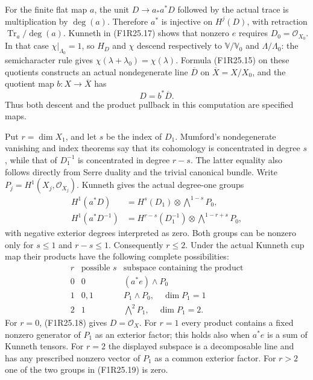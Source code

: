 For the finite flat map $a$, the unit
$D\to a_*a^*D$ followed by the actual trace is
multiplication by $\deg(a)$. Therefore $a^*$ is
injective on $H^j(D)$, with retraction
$\operatorname{Tr}_a/\deg(a)$.
Kunneth in (F1R25.17) shows that nonzero $e$
requires $D_0=\mathcal O_{X_0}$.
In that case $\chi|_{\Lambda_0}=1$, so
$H_D$ and $\chi$ descend respectively to
$\mathbb V/\mathbb V_0$ and $\Lambda/\Lambda_0$:
the semicharacter rule gives
$\chi(\lambda+\lambda_0)=\chi(\lambda)$.
Formula (F1R25.15) on these quotients constructs
an actual nondegenerate line $\overline D$ on
$\overline X=X/X_0$, and the quotient map
$b:X\to\overline X$ has
\[
                             D=b^*\overline D.
 \tag{F1R25.18}
\]
Thus both descent and the product pullback in
this computation are specified maps.

Put $r=\dim X_1$, and let $s$ be the index of
$D_1$. Mumford's nondegenerate vanishing and index
theorems say that its cohomology is concentrated
in degree $s$, while that of $D_1^{-1}$ is
concentrated in degree $r-s$.
The latter equality also follows directly from
Serre duality and the trivial canonical bundle.
Write $P_j=H^1(X_j,\mathcal O_{X_j})$. Kunneth
gives the actual degree-one groups
\[
 \begin{split}
 H^1(a^*D)&=H^s(D_1)\otimes\bigwedge^{1-s}P_0,\\
 H^1(a^*D^{-1})&=H^{r-s}(D_1^{-1})
                         \otimes\bigwedge^{1-r+s}P_0,
 \end{split}
 \tag{F1R25.19}
\]
with negative exterior degrees interpreted as zero.
Both groups can be nonzero only for
$s\le1$ and $r-s\le1$. Consequently $r\le2$.
Under the actual Kunneth cup map their products
have the following complete possibilities:
\[
 \begin{array}{c|c|c}
 r & \text{possible }s & \text{subspace containing the product}\\ \hline
 0 & 0 & (a^*e)\wedge P_0\\
 1 & 0,1 & P_1\wedge P_0,\quad \dim P_1=1\\
 2 & 1 & \bigwedge^2P_1,\quad \dim P_1=2 .
 \end{array}
 \tag{F1R25.20}
\]
For $r=0$, (F1R25.18) gives $D=\mathcal O_X$.
For $r=1$ every product contains a fixed nonzero
generator of $P_1$ as an exterior factor; this
holds also when $a^*e$ is a sum of Kunneth tensors.
For $r=2$ the displayed subspace is a decomposable
line and has any prescribed nonzero vector of
$P_1$ as a common exterior factor. For $r>2$ one
of the two groups in (F1R25.19) is zero.

